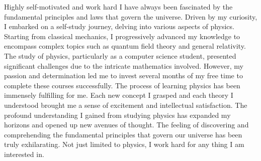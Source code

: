 
\begin{cventries}

	\cventry
	{} %
	{Highly self-motivated and work hard} %
	{\hfill} %
	{} %
	{
		\quad I have always been fascinated by the fundamental principles and laws that govern the universe. Driven by my curiosity, I embarked on a self-study journey, delving into various aspects of physics. Starting from classical mechanics, I progressively advanced my knowledge to encompass complex topics such as quantum field theory and general relativity. The study of physics, particularly as a computer science student, presented significant challenges due to the intricate mathematics involved. However, my passion and determination led me to invest several months of my free time to complete these courses successfully. \newline
		\quad The process of learning physics has been immensely fulfilling for me. Each new concept I grasped and each theory I understood brought me a sense of excitement and intellectual satisfaction. The profound understanding I gained from studying physics has expanded my horizons and opened up new avenues of thought. The feeling of discovering and comprehending the fundamental principles that govern our universe has been truly exhilarating. \newline
		\quad Not just limited to physics, I work hard for any thing I am interested in. \newline
	}
\end{cventries}
